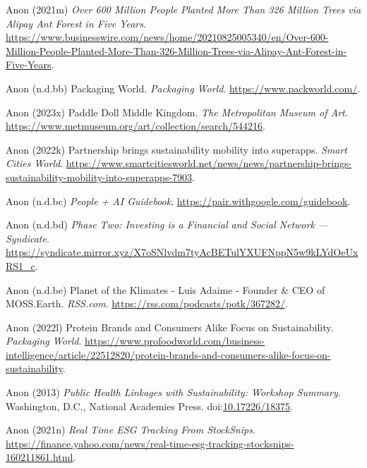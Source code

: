 \documentclass[
  letterpaper,
  DIV=11,
  numbers=noendperiod]{scrartcl}
\newlength{\cslhangindent}
\newenvironment{CSLReferences}[2] %
 {\begin{list}{}{%
  \setlength{\itemindent}{0pt}
  \setlength{\leftmargin}{0pt}
  \setlength{\parsep}{0pt}
  \ifodd #1
   \setlength{\leftmargin}{\cslhangindent}
   \setlength{\itemindent}{-1\cslhangindent}
  \fi
  \setlength{\itemsep}{#2\baselineskip}}}
 {\end{list}}
\begin{document}
\begin{CSLReferences}{0}{1}
Anon (2021m) \emph{Over 600 {Million People Planted More Than} 326
{Million Trees} via {Alipay Ant Forest} in {Five Years}}.
\url{https://www.businesswire.com/news/home/20210825005340/en/Over-600-Million-People-Planted-More-Than-326-Million-Trees-via-Alipay-Ant-Forest-in-Five-Years}.

Anon (n.d.bb) Packaging {World}. \emph{Packaging World}.
\url{https://www.packworld.com/}.

Anon (2023x) Paddle {Doll} {\textbar} {Middle Kingdom}. \emph{The
Metropolitan Museum of Art}.
\url{https://www.metmuseum.org/art/collection/search/544216}.

Anon (2022k) Partnership brings sustainability mobility into superapps.
\emph{Smart Cities World}.
\url{https://www.smartcitiesworld.net/news/news/partnership-brings-sustainability-mobility-into-superapps-7903}.

Anon (n.d.bc) \emph{People + {AI Guidebook}}.
\url{https://pair.withgoogle.com/guidebook}.

Anon (n.d.bd) \emph{Phase {Two}: {Investing} is a {Financial} and
{Social Network} --- {Syndicate}}.
\url{https://syndicate.mirror.xyz/X7oSNlvdm7tyAcBETulYXUFNppN5w9kLYdOeUxRS1_c}.

Anon (n.d.be) Planet of the {Klimates} - {Luis Adaime} - {Founder} \&
{CEO} of {MOSS}.{Earth}. \emph{RSS.com}.
\url{https://rss.com/podcasts/potk/367282/}.

Anon (2022l) Protein {Brands} and {Consumers Alike Focus} on
{Sustainability}. \emph{Packaging World}.
\url{https://www.profoodworld.com/business-intelligence/article/22512820/protein-brands-and-consumers-alike-focus-on-sustainability}.

Anon (2013) \emph{Public {Health Linkages} with {Sustainability}:
{Workshop Summary}}. Washington, D.C., National Academies Press.
doi:\href{https://doi.org/10.17226/18375}{10.17226/18375}.

Anon (2021n) \emph{Real {Time ESG Tracking From StockSnips}}.
\url{https://finance.yahoo.com/news/real-time-esg-tracking-stocksnips-160211861.html}.


\end{CSLReferences}
\end{document}
